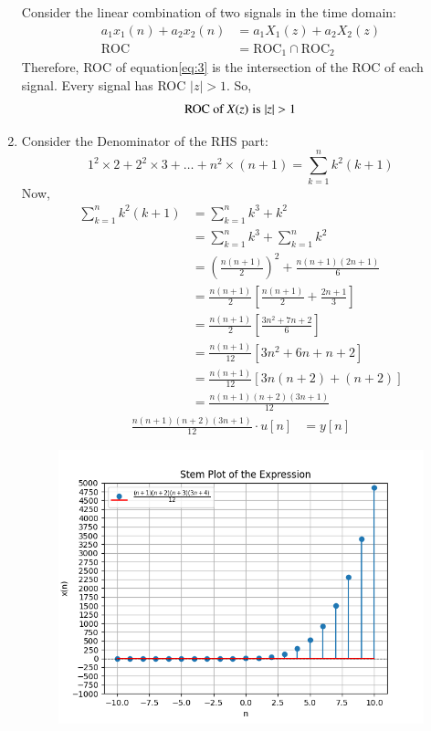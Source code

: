\documentclass[journal,12pt,twocolumn]{IEEEtran}
\theoremstyle{remark}
\begin{document}
\begin{enumerate}[label=\alph*)]
Consider the linear combination of two signals in the time domain:
\begin{align}
    a_1 x_1(n) + a_2 x_2(n) &= a_1 X_1(z) + a_2 X_2(z) \label{eq:combined_signal}\\
    \text{ROC} &= \text{ROC}_1 \cap \text{ROC}_2 \label{eq:roc_intersection}
\end{align}
Therefore, ROC of equation\eqref{eq:3} is the intersection of the ROC of each signal. Every signal has ROC $|z|>1$. So,
\begin{align}
    \text{ROC of $X(z)$} \text{\hspace{3pt}is\hspace{3pt}} |z|>1
\end{align}
  \item Consider the Denominator of the RHS part:
\begin{equation}
    1^2\times2 + 2^2\times3 +\dots + n^2\times(n+1) = \sum_{k=1}^n k^2(k+1)
\end{equation}
Now,\\
\begin{align}
     \sum_{k=1}^n k^2(k+1) &= \sum_{k=1}^n k^3+k^2\\
                           &=  \sum_{k=1}^n k^3 + \sum_{k=1}^n k^2\\
                           &=  \left(\frac{n(n+1)}{2}\right)^{\scriptstyle 2}+\frac{n(n+1)(2n+1)}{6}\\ 
                           &= \frac{n(n+1)}{2}\left[\frac{n(n+1)}{2} +\frac{2n+1}{3}\right]\\
                           &= \frac{n(n+1)}{2}\left[\frac{3n^2+7n+2}{6}\right]\\
                           &= \frac{n(n+1)}{12}\left[3n^2+6n + n+2\right]\\
                           &= \frac{n(n+1)}{12}\left[3n(n+2)+(n+2)\right]\\
                           &= \frac{n(n+1)(n+2)(3n+1)}{12}
\end{align}
\begin{align}
    \frac{n(n+1)(n+2)(3n+1)}{12}\cdot u[n] &= y[n]
\end{align}
\begin{figure}[h]
        \includegraphics[width=\columnwidth]{Figure_2.png}

\end{figure}
\end{enumerate}
\end{document}
